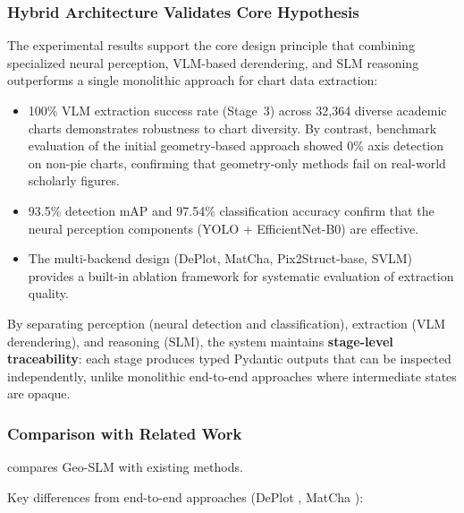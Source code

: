 \subsubsection{Hybrid Architecture Validates Core Hypothesis}

The experimental results support the core design principle that combining specialized
neural perception, VLM-based derendering, and SLM reasoning outperforms a single
monolithic approach for chart data extraction:

\begin{itemize}
    \item 100\% VLM extraction success rate (Stage~3) across 32,364 diverse academic
          charts demonstrates robustness to chart diversity. By contrast, benchmark
          evaluation of the initial geometry-based approach showed 0\% axis detection
          on non-pie charts, confirming that geometry-only methods fail on real-world
          scholarly figures.
    \item 93.5\% detection mAP and 97.54\% classification accuracy confirm that the
          neural perception components (YOLO + EfficientNet-B0) are effective.
    \item The multi-backend design (DePlot, MatCha, Pix2Struct-base, SVLM) provides a
          built-in ablation framework for systematic evaluation of extraction quality.
\end{itemize}

By separating perception (neural detection and classification), extraction (VLM
derendering), and reasoning (SLM), the system maintains \textbf{stage-level
traceability}: each stage produces typed Pydantic outputs that can be inspected
independently, unlike monolithic end-to-end approaches where intermediate states
are opaque.

\subsubsection{Comparison with Related Work}

 compares Geo-SLM with existing methods.

\begin{table}[htbp]
\centering
\caption{Comparison with related chart understanding methods.}
\label{tab:related_cmp}

\end{table}

Key differences from end-to-end approaches (DePlot \cite{liu2023deplot},
MatCha \cite{lee2023matcha}):


